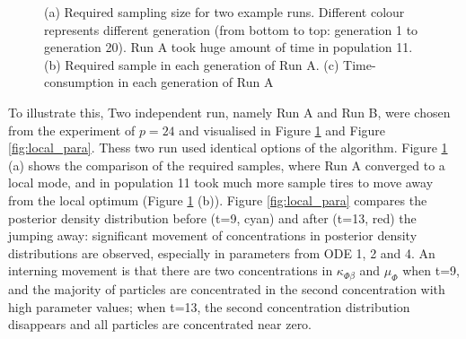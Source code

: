 \begin{figure}[ht]
    \begin{center}
    \end{center}

    \caption[Local optimum and abnormal pattern]{(a) Required sampling size for two example runs. Different colour represents different generation (from bottom to top: generation 1 to generation 20). Run A took huge amount of time in population 11. (b) Required sample in each generation of Run A. (c) Time-consumption in each generation of Run A}
    \label{fig:local_modes}
\end{figure}


To illustrate this, Two independent run, namely Run A and Run B, were chosen from the experiment of $p=24$ and visualised in Figure \ref{fig:local_modes} and Figure \ref{fig:local_para}. Thess two run used identical options of the algorithm. Figure \ref{fig:local_modes} (a) shows the comparison of the required samples, where Run A converged to a local mode, and in population 11 took much more sample tires to move away from the local optimum (Figure \ref{fig:local_modes} (b)). Figure \ref{fig:local_para} compares the posterior density distribution before (t=9, cyan) and after (t=13, red) the jumping away: significant movement of concentrations in posterior density distributions are observed, especially in parameters from ODE 1, 2 and 4. An interning movement is that there are two concentrations in $\kappa_{\Phi\beta}$ and $\mu_\Phi$ when t=9, and the majority of particles are concentrated in the second concentration with high parameter values; when t=13, the second concentration distribution disappears and all particles are concentrated near zero.

